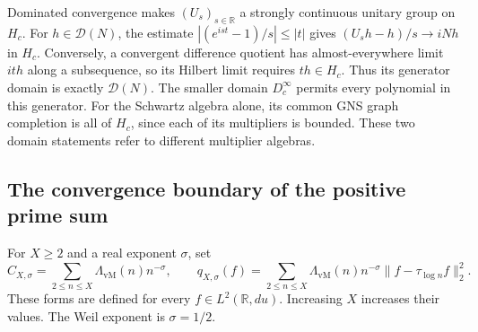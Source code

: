 \documentclass[11pt]{article}
\theoremstyle{definition}
\theoremstyle{remark}
\numberwithin{equation}{section}
\newcommand{\R}{\mathbb R}
\begin{document}
Dominated convergence makes $(U_s)_{s\in\R}$ a strongly continuous
unitary group on $H_c$.
For $h\in\mathcal D(N)$, the estimate
$|(e^{ist}-1)/s|\leq|t|$ gives
$(U_s h-h)/s\to iNh$ in $H_c$.
Conversely, a convergent difference quotient has almost-everywhere limit
$ith$ along a subsequence, so its Hilbert limit requires $th\in H_c$.
Thus its generator domain is exactly $\mathcal D(N)$.
The smaller domain $D_c^\infty$ permits every polynomial in this generator.
For the Schwartz algebra alone, its common GNS graph completion is all
of $H_c$, since each of its multipliers is bounded.
These two domain statements refer to different multiplier algebras.

\subsection{The convergence boundary of the positive prime sum}

For $X\geq2$ and a real exponent $\sigma$, set
\[
 C_{X,\sigma}=\sum_{2\leq n\leq X}
               \Lambda_{\mathrm{vM}}(n)n^{-\sigma},\qquad
 q_{X,\sigma}(f)=\sum_{2\leq n\leq X}
    \Lambda_{\mathrm{vM}}(n)n^{-\sigma}
                        \|f-\tau_{\log n}f\|_2^2.
\]
These forms are defined for every $f\in L^2(\R,du)$.
Increasing $X$ increases their values.
The Weil exponent is $\sigma=1/2$.
\end{document}
